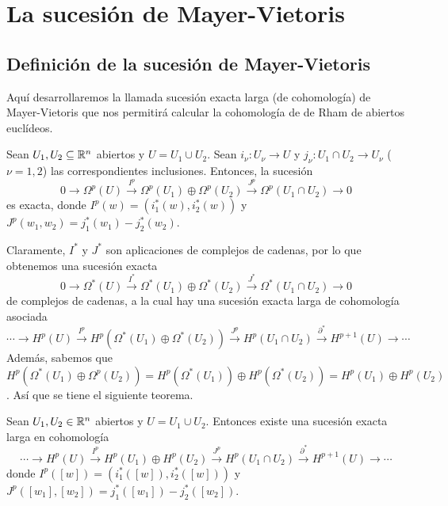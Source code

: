 \documentclass[CV.tex]{subfiles}
\begin{document}

\chapter{La sucesión de Mayer-Vietoris}

\section{Definición de la sucesión de Mayer-Vietoris}
Aquí desarrollaremos la llamada sucesión exacta larga (de cohomología) de Mayer-Vietoris que nos permitirá calcular la cohomología de de Rham de abiertos euclídeos.

\begin{teorema}
Sean $U_1,U_2\subseteq\mathbb{R}^n$ abiertos y $U=U_1\cup U_2$. Sean $i_{\nu}:U_{\nu}\to U$ y $j_{\nu}:U_1\cap U_2\to U_{\nu}$ ($\nu=1,2$) las correspondientes inclusiones. Entonces, la sucesión
\[
0\to \Omega^p(U)\overset{I^p}{\to}\Omega^p(U_1)\oplus\Omega^p(U_2)\overset{J^p}{\to}\Omega^p(U_1\cap U_2)\to 0
\]
es exacta, donde $I^p(w)=(i_1^*(w), i_2^*(w))$ y $J^p(w_1,w_2)=j_1^*(w_1)-j_2^*(w_2)$.
\end{teorema}
\begin{dem}
\QED
\end{dem}

Claramente, $I^*$ y $J^*$ son aplicaciones de complejos de cadenas, por lo que obtenemos una sucesión exacta
\[
0\to \Omega^*(U)\overset{I^*}{\to}\Omega^*(U_1)\oplus\Omega^*(U_2)\overset{J^*}{\to}\Omega^*(U_1\cap U_2)\to 0
\]
de complejos de cadenas, a la cual hay una sucesión exacta larga de cohomología asociada
\[
\cdots\to H^p(U)\overset{I^p}{\to}H^p(\Omega^*(U_1)\oplus \Omega^*(U_2))\overset{J^p}{\to}H^p(U_1\cap U_2)\overset{\partial^*}{\to}H^{p+1}(U)\to \cdots
\]
Además, sabemos que $H^p(\Omega^*(U_1)\oplus \Omega^p(U_2))=H^p(\Omega^*(U_1))\oplus H^p(\Omega^*(U_2))=H^p(U_1)\oplus H^p(U_2)$. Así que se tiene el siguiente teorema.

\begin{teorema} Sean $U_1,U_2\in\mathbb{R}^n$ abiertos y $U=U_1\cup U_2$. Entonces existe una sucesión exacta larga en cohomología
\[
\cdots\to H^p(U)\overset{I^p}{\to}H^p(U_1)\oplus H^p(U_2)\overset{J^p}{\to}H^p(U_1\cap U_2)\overset{\partial^*}{\to}H^{p+1}(U)\to \cdots
\]
donde $I^p([w])=(i_1^*([w]), i_2^*([w]))$ y $J^p([w_1],[w_2])=j_1^*([w_1])-j_2^*([w_2])$.
\end{teorema}
\end{document}

